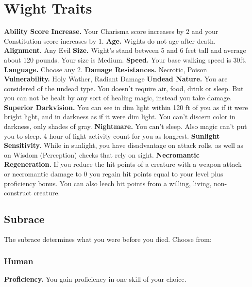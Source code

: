 \documentclass[a4paper,10pt,twoside,twocolumn]{dndbook} %
\begin{document}
	\section{Wight Traits}
	\textbf{Ability Score Increase.} Your Charisma score increases by 2 and your Constitution score increases by 1.\linebreak
	\textbf{Age.} Wights do not age after death.\linebreak
	\textbf{Alignment.} Any Evil\linebreak
	\textbf{Size.} Wight's stand between 5 and 6 feet tall and average about 120 pounds. Your size is Medium.\linebreak
	\textbf{Speed.} Your base walking speed is 30ft.\linebreak
	\textbf{Language.} Choose any 2.\linebreak
	\textbf{Damage Resistances.} Necrotic, Poison\linebreak
	\textbf{Vulnerability.} Holy Wather, Radiant Damage\linebreak
	\textbf{Undead Nature.} You are considered of the undead type. You doesn't require air, food, drink or sleep. But you can not be healt by any sort of healing magic, instead you take damage. \linebreak
	\textbf{Superior Darkvision.} You can see in dim light within 120 ft of you as if it were bright light, and in darkness as if it were dim light. You can't discern color in darkness, only shades of gray.\linebreak
	\textbf{Nightmare.} You can't sleep. Also magic can't put you to sleep. 4 hour of light activity count for you as longrest.\linebreak
	\textbf{Sunlight Sensitivity.} While in sunlight, you have disadvantage on attack rolls, as well as on Wisdom (Perception) checks that rely on sight.\linebreak
	\textbf{Necromantic Regeneration.} If you reduce the hit points of a creature with a weapon attack or necromantic damage to 0 you regain hit points equal to your level plus proficiency bonus. You can also leech hit points from a willing, living, non-construct creature.\linebreak
	\subsection{Subrace} The subrace determines what you were before you died. Choose from:\linebreak
	\subsubsection{Human}
	\textbf{Proficiency.} You gain proficiency in one skill of your choice.
\end{document}
